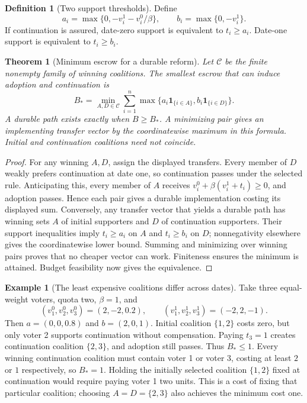 \documentclass[11pt]{article}
\newtheorem{theorem}{Theorem}
\theoremstyle{definition}
\newtheorem{definition}{Definition}
\newtheorem{example}{Example}
\begin{document}
\begin{definition}[Two support thresholds]
Define
\[
 a_i=\max\{0,-v_i^1-v_i^0/\beta\},\qquad
 b_i=\max\{0,-v_i^1\}.
\]
If continuation is assured, date-zero support is equivalent to $t_i\geq a_i$. Date-one support is equivalent to $t_i\geq b_i$.
\end{definition}

\begin{theorem}[Minimum escrow for a durable reform]
Let $\mathcal C$ be the finite nonempty family of winning coalitions. The smallest escrow that can induce adoption and continuation is
\[
 B_* =\min_{A,D\in\mathcal C}\sum_{i=1}^n
       \max\{a_i\mathbf1_{\{i\in A\}},
                   b_i\mathbf1_{\{i\in D\}}\}.
\]
A durable path exists exactly when $B\geq B_*$. A minimizing pair gives an implementing transfer vector by the coordinatewise maximum in this formula. Initial and continuation coalitions need not coincide.
\end{theorem}
\begin{proof}
For any winning $A,D$, assign the displayed transfers. Every member of $D$ weakly prefers continuation at date one, so continuation passes under the selected rule. Anticipating this, every member of $A$ receives $v_i^0+\beta(v_i^1+t_i)\geq0$, and adoption passes. Hence each pair gives a durable implementation costing its displayed sum.
Conversely, any transfer vector that yields a durable path has winning sets $A$ of initial supporters and $D$ of continuation supporters. Their support inequalities imply $t_i\geq a_i$ on $A$ and $t_i\geq b_i$ on $D$; nonnegativity elsewhere gives the coordinatewise lower bound. Summing and minimizing over winning pairs proves that no cheaper vector can work. Finiteness ensures the minimum is attained. Budget feasibility now gives the equivalence.
\end{proof}

\begin{example}[The least expensive coalitions differ across dates]
Take three equal-weight voters, quota two, $\beta=1$, and
\[
 (v_1^0,v_2^0,v_3^0)=(2,-2,0.2),\qquad
 (v_1^1,v_2^1,v_3^1)=(-2,2,-1).
\]
Then $a=(0,0,0.8)$ and $b=(2,0,1)$. Initial coalition $\{1,2\}$ costs zero, but only voter 2 supports continuation without compensation. Paying $t_3=1$ creates continuation coalition $\{2,3\}$, and adoption still passes. Thus $B_*\leq1$. Every winning continuation coalition must contain voter 1 or voter 3, costing at least $2$ or $1$ respectively, so $B_*=1$. Holding the initially selected coalition $\{1,2\}$ fixed at continuation would require paying voter 1 two units. This is a cost of fixing that particular coalition; choosing $A=D=\{2,3\}$ also achieves the minimum cost one.
\end{example}
\end{document}
